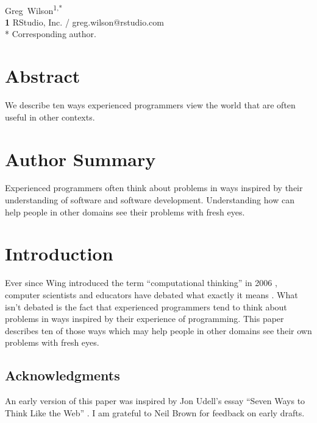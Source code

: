 \documentclass[10pt,letterpaper]{article}
\begin{document}
\vspace*{0.2in}

\begin{flushleft}
{\Large
\textbf{}
}
\newline
\\
{Greg~Wilson}\textsuperscript{1,*}
\\
\textbf{1} RStudio, Inc. / greg.wilson@rstudio.com
\\
\bigskip
* Corresponding author.
\end{flushleft}

\section*{Abstract}

We describe ten ways experienced programmers view the world that are often
useful in other contexts.

\section*{Author Summary}

Experienced programmers often think about problems in ways inspired by their
understanding of software and software development.  Understanding how can help
people in other domains see their problems with fresh eyes.

\section*{Introduction}

Ever since Wing introduced the term ``computational thinking'' in 2006
\cite{Wing2006}, computer scientists and educators have debated what exactly it
means \cite{Denn2017}.  What isn't debated is the fact that experienced
programmers tend to think about problems in ways inspired by their experience of
programming.  This paper describes ten of those ways which may help people in
other domains see their own problems with fresh eyes.

\subsection*{Acknowledgments}

An early version of this paper was inspired by Jon Udell's essay ``Seven Ways to
Think Like the Web'' \cite{Udel2011}.  I am grateful to Neil Brown for feedback
on early drafts.
\end{document}

